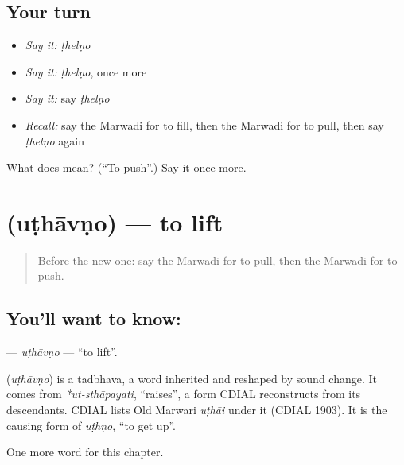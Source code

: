 \subsection*{Your turn}
\begin{itemize}
\raggedright
  \item \emph{Say it:} \emph{ṭhelṇo}
  \item \emph{Say it:} \emph{ṭhelṇo}, once more
  \item \emph{Say it:} say \emph{ṭhelṇo}
  \item \emph{Recall:} say the Marwadi for to fill, then the Marwadi for to pull, then say \emph{ṭhelṇo} again
\end{itemize}

\begin{tcolorbox}[breakable,colback=teal!4,colframe=teal!35!black,title={Before you move on}]
What does  mean? (\textquotedblleft{}To push\textquotedblright{}.) Say it once more.
\end{tcolorbox}
\section[\texorpdfstring{\mw{उठावणो} (uṭhāvṇo)}{उठावणो (uṭhāvṇo)}]{ (uṭhāvṇo) — to lift}

\label{lesson:MW-C106-uthavno}



\begin{quote}
Before the new one: say the Marwadi for to pull, then the Marwadi for to push.
\end{quote}

\subsection*{You'll want to know: }
\textbf{} — \emph{uṭhāvṇo} — \textquotedblleft{}to lift\textquotedblright{}.

\begin{cousinweb}
\textbf{} (\emph{uṭhāvṇo}) is a tadbhava, a word inherited and reshaped by sound change. It comes from \emph{*ut-sthāpayati}, \textquotedblleft{}raises\textquotedblright{}, a form CDIAL reconstructs from its descendants. CDIAL lists Old Marwari \emph{uṭhāi} under it (CDIAL 1903). It is the causing form of \emph{uṭhṇo}, \textquotedblleft{}to get up\textquotedblright{}.
\end{cousinweb}

\begin{grammarlens}[title={What you've built}]
One more word for this chapter.
\end{grammarlens}

